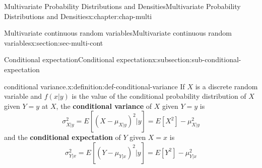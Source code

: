 \documentclass[oneside,10pt,]{book}
\newcommand{\terminology}[1]{\textbf{#1}}
\numberwithin{equation}{section}
\begin{document}
\begin{chapterptx}{Multivariate Probability Distributions and Densities}{}{Multivariate Probability Distributions and Densities}{}{}{x:chapter:chap-multi}
\begin{sectionptx}{Multivariate continuous random variables}{}{Multivariate continuous random variables}{}{}{x:section:sec-multi-cont}
\begin{subsectionptx}{Conditional expectation}{}{Conditional expectation}{}{}{x:subsection:sub-conditional-expectation}
\begin{definition}{conditional variance.}{x:definition:def-conditional-variance}
If \(X\) is a discrete random variable and \(\displaystyle f(x|y)\) is the value of the conditional probability distribution of \(X\) given \(\displaystyle Y = y\) at \(X\), the \terminology{conditional variance} of \(X\) given \(\displaystyle Y = y\) is%
\begin{equation*}
\sigma^2_{X|y} = E[(X-\mu_{X|y})^2|y] = E[X^2]-\mu^2_{X|y}
\end{equation*}
and the \terminology{conditional expectation} of \(Y\) given \(\displaystyle X = x\) is%
\begin{equation*}
\displaystyle\sigma^2_{Y|x} = E[(Y-\mu_{Y|x})^2|y] =
E[Y^2]-\mu^2_{Y|x}
\end{equation*}
%
\end{definition}
\end{subsectionptx}
\end{sectionptx}
\end{chapterptx}
%
%
%
%
\typeout{************************************************}
\typeout{************************************************}
%
%
\appendix
%
\end{document}
